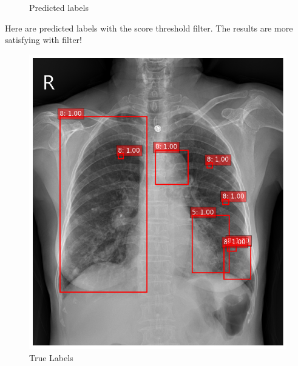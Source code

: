 \documentclass[12pt,oneside]{book} %
\begin{document}
\begin{figure}[H]
\begin{minipage}[b]{0.45\textwidth}
        \caption{Predicted labels}
        \label{fig:predictions_without_filter} %
    \end{minipage}
\end{figure}

Here are predicted labels with the score threshold filter. The results are more
satisfying with filter!

\begin{figure}[H]
    \centering
    \begin{minipage}[b]{0.45\textwidth}
        \includegraphics[width=\textwidth]{../results/true_labels.png}
        \caption{True Labels}
        \label{fig:true_labels}
    \end{minipage}
    \hfill %
    \begin{minipage}[b]{0.45\textwidth}

\end{minipage}
\end{figure}
\end{document}
